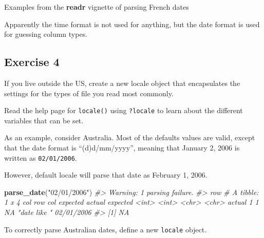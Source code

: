 \documentclass[]{book}
\newenvironment{Shaded}{\begin{snugshade}}{\end{snugshade}}
\newcommand{\CommentTok}[1]{\textcolor[rgb]{0.56,0.35,0.01}{\textit{#1}}}
\newcommand{\DataTypeTok}[1]{\textcolor[rgb]{0.13,0.29,0.53}{#1}}
\newcommand{\KeywordTok}[1]{\textcolor[rgb]{0.13,0.29,0.53}{\textbf{#1}}}
\newcommand{\NormalTok}[1]{#1}
\newcommand{\StringTok}[1]{\textcolor[rgb]{0.31,0.60,0.02}{#1}}
\theoremstyle{plain}
\theoremstyle{remark}
\theoremstyle{definition}
\theoremstyle{definition}
\theoremstyle{definition}
\theoremstyle{remark}
\begin{document}
Examples from the \textbf{readr} vignette of parsing French dates

\begin{Shaded}
\end{Shaded}

Apparently the time format is not used for anything, but the date format
is used for guessing column types.

\hypertarget{exercise-4-14}{%
\subsection{Exercise 4}\label{exercise-4-14}}

If you live outside the US, create a new locale object that encapsulates
the settings for the types of file you read most commonly.

Read the help page for \texttt{locale()} using \texttt{?locale} to learn
about the different variables that can be set.

As an example, consider Australia. Most of the defaults values are
valid, except that the date format is ``(d)d/mm/yyyy'', meaning that
January 2, 2006 is written as \texttt{02/01/2006}.

However, default locale will parse that date as February 1, 2006.

\begin{Shaded}
\begin{Highlighting}[]
\KeywordTok{parse_date}\NormalTok{(}\StringTok{"02/01/2006"}\NormalTok{)}
\CommentTok{#> Warning: 1 parsing failure.}
\CommentTok{#> row # A tibble: 1 x 4 col     row   col expected     actual     expected   <int> <int> <chr>        <chr>      actual 1     1    NA "date like " 02/01/2006}
\CommentTok{#> [1] NA}
\end{Highlighting}
\end{Shaded}

To correctly parse Australian dates, define a new \texttt{locale}
object.
\end{document}
